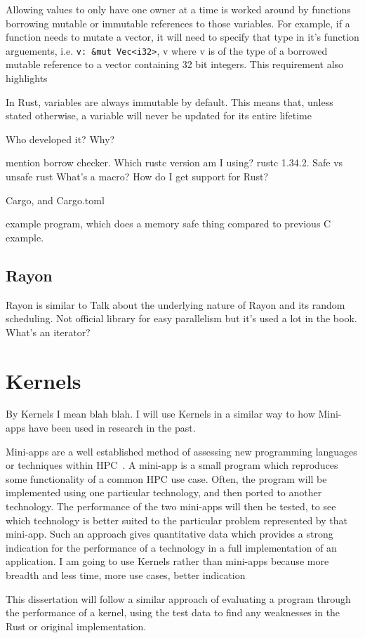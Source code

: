 Allowing values to only have one owner at a time is worked around by functions borrowing mutable or immutable references to those variables. For example, if a function needs to mutate a vector, it will need to specify that type in it's function arguements, i.e. \texttt{v: \&mut Vec<i32>}, v where v is of the type of a borrowed mutable reference to a vector containing 32 bit integers. This requirement also highlights

In Rust, variables are always immutable by default. This means that, unless stated otherwise, a variable will never be updated for its entire lifetime

Who developed it? Why?

mention borrow checker. Which rustc version am I using? rustc 1.34.2. Safe vs unsafe rust
What's a macro?
How do I get support for Rust?

Cargo, and Cargo.toml
 
example program, which does a memory safe thing compared to previous C example.
\subsection{Rayon}
Rayon is similar to 
Talk about the underlying nature of Rayon and its random scheduling. Not official library for easy parallelism but it's used a lot in the book.
What's an iterator?
\section{Kernels}
By Kernels I mean blah blah. I will use Kernels in a similar way to how Mini-apps have been used in research in the past.

Mini-apps are a well established method of assessing new programming languages or techniques within HPC~\cite{Mallinson:2014, Slaughter:2015, martineau2017arch}. A mini-app is a small program which reproduces some functionality of a common HPC use case. Often, the program will be implemented using one particular technology, and then ported to another technology. The performance of the two mini-apps will then be tested, to see which technology is better suited to the particular problem represented by that mini-app. Such an approach gives quantitative data which provides a strong indication for the performance of a technology in a full implementation of an application. I am going to use Kernels rather than mini-apps because more breadth and less time, more use cases, better indication

This dissertation will follow a similar approach of evaluating a program through the performance of a kernel, using the test data to find any weaknesses in the Rust or original implementation.


